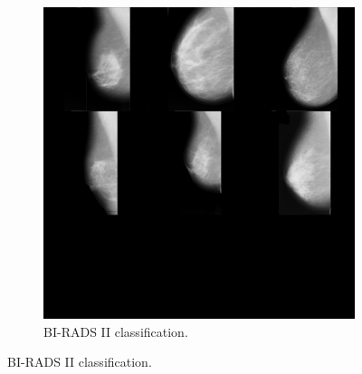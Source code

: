 \begin{figure}[H]
\begin{subfigure}[t]{0.3\textwidth}
        \includegraphics[width=\textwidth]{Appendix5/sample2/big_scan_sample2.png}
        \caption{BI-RADS II classification.}
        \label{fig:app-sample2-input}
    \end{subfigure}


\end{figure}
